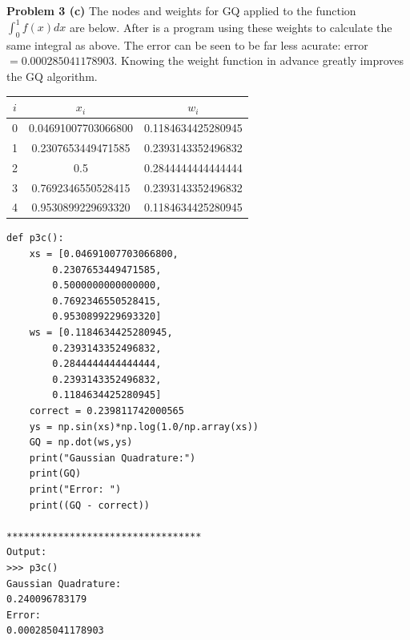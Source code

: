 \documentclass[12pt]{article}
\newcommand{\problem}[1]{\hspace{-4 ex} \large \textbf{Problem #1} }
\begin{document}
\bigbreak
\problem{3 (c)} The nodes and weights for GQ applied to the function $\int_0^1 f(x)dx$ are below. After is a program using these weights to calculate the same integral as above. The error can be seen to be far less acurate: error$= 0.000285041178903$. Knowing the weight function in advance greatly improves the GQ algorithm.
\begin{center}
	\begin{tabular}{|c|c|c|}\hline
		$i$ & $x_i$ & $w_i$\\ \hline
		0 & 0.04691007703066800 & 0.1184634425280945 \\ \hline
		1 & 0.2307653449471585 & 0.2393143352496832 \\ \hline
		2 & 0.5 & 0.2844444444444444 \\ \hline
		3 & 0.7692346550528415 & 0.2393143352496832 \\ \hline
		4 & 0.9530899229693320 & 0.1184634425280945 \\ \hline	
	\end{tabular}
\end{center}
\begin{lstlisting}
def p3c():
	xs = [0.04691007703066800,
		0.2307653449471585,
		0.5000000000000000,
		0.7692346550528415,
		0.9530899229693320]
	ws = [0.1184634425280945,
		0.2393143352496832,
		0.2844444444444444,
		0.2393143352496832,
		0.1184634425280945]
	correct = 0.239811742000565
	ys = np.sin(xs)*np.log(1.0/np.array(xs))
	GQ = np.dot(ws,ys)
	print("Gaussian Quadrature:")
	print(GQ)
	print("Error: ")
	print((GQ - correct))

**********************************
Output:
>>> p3c()
Gaussian Quadrature:
0.240096783179
Error: 
0.000285041178903
\end{lstlisting}
\end{document}
